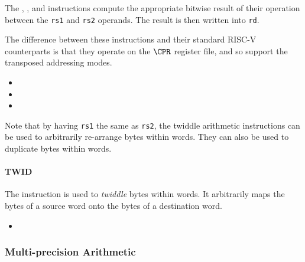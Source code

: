 The , , and  instructions compute the
appropriate bitwise result of their operation between the {\tt rs1} and
{\tt rs2} operands. The result is then written into {\tt rd}.

The difference between these instructions and their standard RISC-V
counterparts is that they operate on the $\CPR$ register file, and so
support the transposed addressing modes.

\begin{itemize}
\item {}
\item {}
\item {}
\end{itemize}

Note that by having {\tt rs1} the same as {\tt rs2}, the twiddle
arithmetic instructions can be used to arbitrarily re-arrange bytes
within words. They can also be used to duplicate bytes within words.

\paragraph{TWID}

The  instruction is used to {\em twiddle} bytes within words.
It arbitrarily maps the bytes of a source word onto the bytes of a
destination word.

\begin{itemize}
\item {}
\end{itemize}


\subsubsection{Multi-precision Arithmetic}
